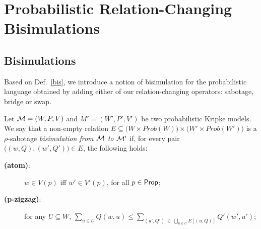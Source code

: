 \section{Probabilistic Relation-Changing Bisimulations}
\label{sec:bisimulation}

\subsection{Bisimulations}
\label{sec:bisimdef}

Based on Def.~\ref{bis}, we introduce a notion of bisimulation for the probabilistic language obtained by adding either of our relation-changing operators: sabotage, bridge or swap. 

\begin{definition}[Bisimulation] \label{switch_bis} Let  $\mathcal{M}=(W,P, V)$ and  $M' = (W', P', V')$ be two probabilistic Kripke models. %
We say that a non-empty relation $E\subseteq \big(W\times Prob(W)\big) \times \big(W'\times Prob(W')\big)$ is a $\rho$-sabotage \emph{bisimulation from $\mathcal{M}$ to $\mathcal{M}'$} if, for every pair $\big((w,Q) ,(w',Q')\big)\in E$, the following holds:

\begin{description}


\item[\textbf{(atom)}:] $w\in V(p)$ iff $w'\in V'(p)$, for all $p\in\mathsf{Prop}$;

\item [\textbf{(p-zigzag)}:] for any $U \subseteq W$, $\displaystyle \sum_{u \in U} Q(w, u) \leq \displaystyle \sum_{ (u',Q') \ \in \ \bigcup_{u\in U}E[(u,Q)]} Q'(w', u')$;



\end{description}
\end{definition}
